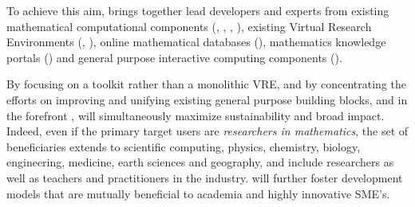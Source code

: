 \begin{center}
  \begin{boxedminipage}{.95\textwidth}\em

    To achieve this aim, \TheProject brings together lead developers
    and experts from existing mathematical computational components
    (\Linbox, \GAP, \Sage, \Singular), existing Virtual Research
    Environments (\SMC, \Simulagora), online mathematical databases
    (\LMFDB), mathematics knowledge portals (\MathHub) and general
    purpose interactive computing components (\Jupyter).

  \end{boxedminipage}
\end{center}

\begin{center}
  \begin{boxedminipage}{.95\textwidth}\em

    By focusing on a toolkit rather than a monolithic VRE, and by
    concentrating the efforts on improving and unifying existing
    general purpose building blocks, and in the forefront \Jupyter,
    \TheProject will simultaneously maximize sustainability and broad
    impact. Indeed, even if the primary target users are
    \emph{researchers in mathematics}, the set of beneficiaries
    extends to scientific computing, physics, chemistry, biology,
    engineering, medicine, earth sciences and geography, and include
    researchers as well as teachers and practitioners in the
    industry. \TheProject will further foster development models that
    are mutually beneficial to academia and highly innovative SME's.
  \end{boxedminipage}
\end{center}


